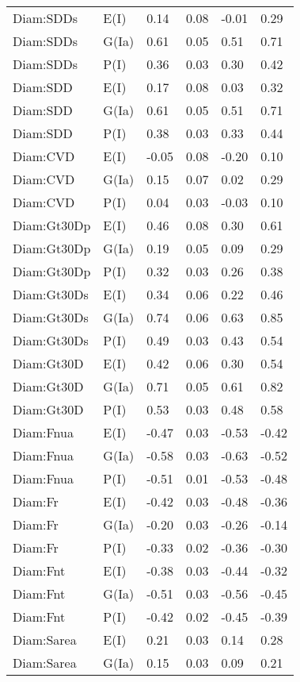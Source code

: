 \begin{center}
\begin{longtable}{|p{1.1in}|p{0.7in}|p{0.7in}|p{0.6in}|p{0.6in}|p{0.6in}|}
  Diam:SDDs & E(I) & 0.14 & 0.08 & -0.01 & 0.29 \\ 
  Diam:SDDs & G(Ia) & 0.61 & 0.05 & 0.51 & 0.71 \\ 
  Diam:SDDs & P(I) & 0.36 & 0.03 & 0.30 & 0.42 \\ 
  Diam:SDD & E(I) & 0.17 & 0.08 & 0.03 & 0.32 \\ 
  Diam:SDD & G(Ia) & 0.61 & 0.05 & 0.51 & 0.71 \\ 
  Diam:SDD & P(I) & 0.38 & 0.03 & 0.33 & 0.44 \\ 
  Diam:CVD & E(I) & -0.05 & 0.08 & -0.20 & 0.10 \\ 
  Diam:CVD & G(Ia) & 0.15 & 0.07 & 0.02 & 0.29 \\ 
  Diam:CVD & P(I) & 0.04 & 0.03 & -0.03 & 0.10 \\ 
  Diam:Gt30Dp & E(I) & 0.46 & 0.08 & 0.30 & 0.61 \\ 
  Diam:Gt30Dp & G(Ia) & 0.19 & 0.05 & 0.09 & 0.29 \\ 
  Diam:Gt30Dp & P(I) & 0.32 & 0.03 & 0.26 & 0.38 \\ 
  Diam:Gt30Ds & E(I) & 0.34 & 0.06 & 0.22 & 0.46 \\ 
  Diam:Gt30Ds & G(Ia) & 0.74 & 0.06 & 0.63 & 0.85 \\ 
  Diam:Gt30Ds & P(I) & 0.49 & 0.03 & 0.43 & 0.54 \\ 
  Diam:Gt30D & E(I) & 0.42 & 0.06 & 0.30 & 0.54 \\ 
  Diam:Gt30D & G(Ia) & 0.71 & 0.05 & 0.61 & 0.82 \\ 
  Diam:Gt30D & P(I) & 0.53 & 0.03 & 0.48 & 0.58 \\ 
  Diam:Fnua & E(I) & -0.47 & 0.03 & -0.53 & -0.42 \\ 
  Diam:Fnua & G(Ia) & -0.58 & 0.03 & -0.63 & -0.52 \\ 
  Diam:Fnua & P(I) & -0.51 & 0.01 & -0.53 & -0.48 \\ 
  Diam:Fr & E(I) & -0.42 & 0.03 & -0.48 & -0.36 \\ 
  Diam:Fr & G(Ia) & -0.20 & 0.03 & -0.26 & -0.14 \\ 
  Diam:Fr & P(I) & -0.33 & 0.02 & -0.36 & -0.30 \\ 
  Diam:Fnt & E(I) & -0.38 & 0.03 & -0.44 & -0.32 \\ 
  Diam:Fnt & G(Ia) & -0.51 & 0.03 & -0.56 & -0.45 \\ 
  Diam:Fnt & P(I) & -0.42 & 0.02 & -0.45 & -0.39 \\ 
  Diam:Sarea & E(I) & 0.21 & 0.03 & 0.14 & 0.28 \\ 
  Diam:Sarea & G(Ia) & 0.15 & 0.03 & 0.09 & 0.21 \\ 

\end{longtable}
\end{center}
